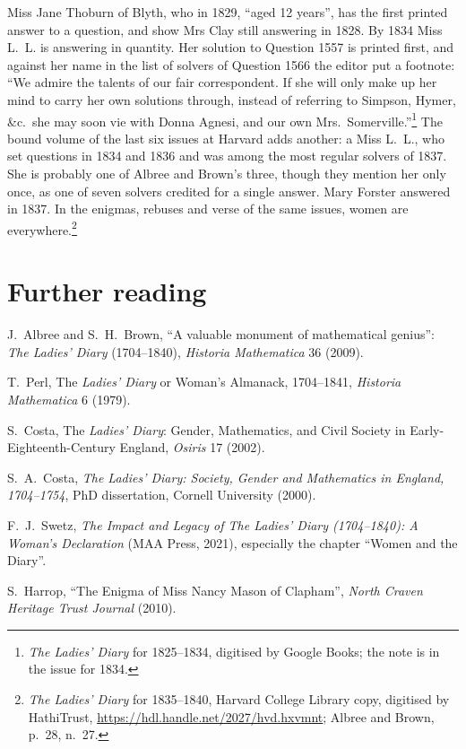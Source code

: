 \documentclass[11pt,a4paper]{article}
\begin{document}
\begin{itemize}
Miss Jane Thoburn of Blyth, who in 1829, ``aged 12 years'', has the first printed answer
to a question, and show Mrs Clay still answering in 1828. By 1834 Miss L.~L. is answering
in quantity. Her solution to Question 1557 is printed first, and against her name
in the list of solvers of Question 1566 the editor put a footnote: ``We admire
the talents of our fair correspondent. If she will only make up her mind to carry her
own solutions through, instead of referring to Simpson, Hymer, \&c.\ she may soon vie
with Donna Agnesi, and our own Mrs.\ Somerville.''\footnote{\textit{The Ladies' Diary} for
1825--1834, digitised by Google Books; the note is in the issue for 1834.} The bound volume of the last six
issues at Harvard adds another: a Miss L.~L., who set questions in 1834 and 1836 and was
among the most regular solvers of 1837. She is probably one of Albree and Brown's
three, though they mention her only once, as one of seven solvers credited for a single
answer. Mary Forster answered in 1837. In the enigmas, rebuses and verse of the same
issues, women are everywhere.\footnote{\textit{The Ladies' Diary} for 1835--1840,
Harvard College Library copy, digitised by HathiTrust,
\url{https://hdl.handle.net/2027/hvd.hxvmnt}; Albree and Brown, p.~28, n.~27.}
\end{itemize}

\section*{Further reading}

J.~Albree and S.~H.~Brown, ``A valuable monument of mathematical genius'': \textit{The
Ladies' Diary} (1704--1840), \textit{Historia Mathematica} 36 (2009).

T.~Perl, The \textit{Ladies' Diary} or Woman's Almanack, 1704--1841, \textit{Historia
Mathematica} 6 (1979).

S.~Costa, The \textit{Ladies' Diary}: Gender, Mathematics, and Civil Society in
Early-Eighteenth-Century England, \textit{Osiris} 17 (2002).

S.~A.~Costa, \textit{The Ladies' Diary: Society, Gender and Mathematics in England,
1704--1754}, PhD dissertation, Cornell University (2000).

F.~J.~Swetz, \textit{The Impact and Legacy of The Ladies' Diary (1704--1840): A Woman's
Declaration} (MAA Press, 2021), especially the chapter ``Women and the Diary''.

S.~Harrop, ``The Enigma of Miss Nancy Mason of Clapham'', \textit{North Craven Heritage
Trust Journal} (2010).
\end{document}

